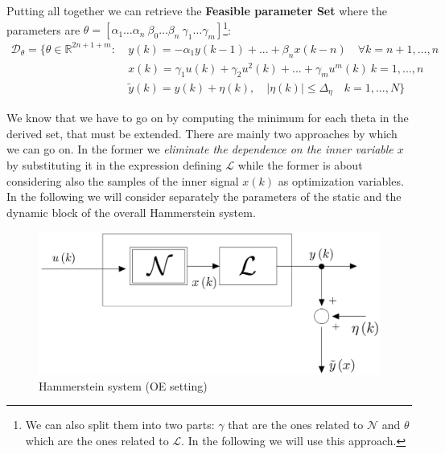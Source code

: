 \noindent
Putting all together we can retrieve the    \textbf{Feasible parameter Set} where the parameters are $\theta=[\alpha_1 \dots \alpha_n \ \beta_0 \dots \beta_n \ \gamma_1 \dots \gamma_m]$\footnote{
    We can also split them into two parts: $\gamma$ that are the ones related to $\mathcal{N}$ and $\theta$ which are the ones related to $\mathcal{L}$. In the following we will use this approach.
}: 
\begin{equation}
    \begin{aligned}
        \mathcal{D}_\theta=\big\{
        \theta\in\mathbb{R}^{2n+1+m}: \ 
        &y(k)=-\alpha_1{y(k-1)+...+\beta_n{x(k-n)}} \quad \forall{k=n+1,...,n}\\
        & x(k)=\gamma_1{u(k)}+\gamma_2{u^2(k)}+...+\gamma_m{u^{m}(k)} \ k=1,...,n \\
        &\tilde{y}(k)=y(k)+\eta(k), \quad 
        \vert \eta(k) \vert \le \Delta_\eta \quad k=1,..., N
    \big\}
    \end{aligned}
\end{equation}

\noindent
We know that we have to go on by computing the minimum for each theta in the derived set, that must be extended. There are mainly two approaches by which we can go on. In the former we \textit{eliminate the dependence on the inner variable $x$} by substituting it in the expression defining $\mathcal{L}$ while the former is about considering also the samples of the inner signal $x(k)$ as optimization variables. In the following we will consider separately the parameters of the static and the dynamic block of the overall Hammerstein system.

\begin{figure}
    \centering
    \includegraphics[scale=0.2]{img/hammer_OE.jpg}
    \caption{Hammerstein system (OE setting)}
\end{figure}

